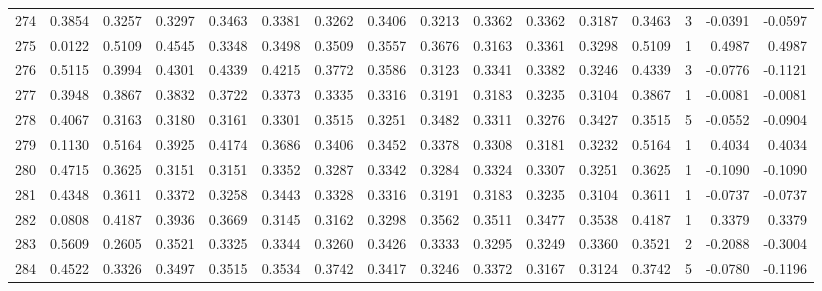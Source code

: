 \begin{tabular}{lrrrrrrrrrrrrrrr}
274 &      0.3854 &  0.3257 &  0.3297 &  0.3463 &  0.3381 &  0.3262 &  0.3406 &  0.3213 &  0.3362 &  0.3362 &   0.3187 &     0.3463 &      3 &                   -0.0391 &                    -0.0597 \\
275 &      0.0122 &  0.5109 &  0.4545 &  0.3348 &  0.3498 &  0.3509 &  0.3557 &  0.3676 &  0.3163 &  0.3361 &   0.3298 &     0.5109 &      1 &                    0.4987 &                     0.4987 \\
276 &      0.5115 &  0.3994 &  0.4301 &  0.4339 &  0.4215 &  0.3772 &  0.3586 &  0.3123 &  0.3341 &  0.3382 &   0.3246 &     0.4339 &      3 &                   -0.0776 &                    -0.1121 \\
277 &      0.3948 &  0.3867 &  0.3832 &  0.3722 &  0.3373 &  0.3335 &  0.3316 &  0.3191 &  0.3183 &  0.3235 &   0.3104 &     0.3867 &      1 &                   -0.0081 &                    -0.0081 \\
278 &      0.4067 &  0.3163 &  0.3180 &  0.3161 &  0.3301 &  0.3515 &  0.3251 &  0.3482 &  0.3311 &  0.3276 &   0.3427 &     0.3515 &      5 &                   -0.0552 &                    -0.0904 \\
279 &      0.1130 &  0.5164 &  0.3925 &  0.4174 &  0.3686 &  0.3406 &  0.3452 &  0.3378 &  0.3308 &  0.3181 &   0.3232 &     0.5164 &      1 &                    0.4034 &                     0.4034 \\
280 &      0.4715 &  0.3625 &  0.3151 &  0.3151 &  0.3352 &  0.3287 &  0.3342 &  0.3284 &  0.3324 &  0.3307 &   0.3251 &     0.3625 &      1 &                   -0.1090 &                    -0.1090 \\
281 &      0.4348 &  0.3611 &  0.3372 &  0.3258 &  0.3443 &  0.3328 &  0.3316 &  0.3191 &  0.3183 &  0.3235 &   0.3104 &     0.3611 &      1 &                   -0.0737 &                    -0.0737 \\
282 &      0.0808 &  0.4187 &  0.3936 &  0.3669 &  0.3145 &  0.3162 &  0.3298 &  0.3562 &  0.3511 &  0.3477 &   0.3538 &     0.4187 &      1 &                    0.3379 &                     0.3379 \\
283 &      0.5609 &  0.2605 &  0.3521 &  0.3325 &  0.3344 &  0.3260 &  0.3426 &  0.3333 &  0.3295 &  0.3249 &   0.3360 &     0.3521 &      2 &                   -0.2088 &                    -0.3004 \\
284 &      0.4522 &  0.3326 &  0.3497 &  0.3515 &  0.3534 &  0.3742 &  0.3417 &  0.3246 &  0.3372 &  0.3167 &   0.3124 &     0.3742 &      5 &                   -0.0780 &                    -0.1196 \\

\end{tabular}
